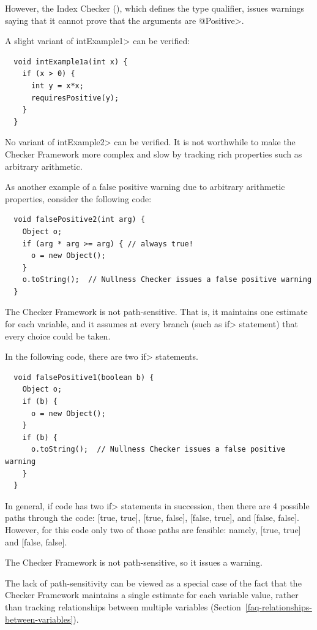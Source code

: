 \noindent
However, the Index Checker (), which defines the
 type qualifier, issues warnings
saying that it cannot prove that the arguments are \<@Positive>.

A slight variant of \<intExample1> can be verified:

\begin{Verbatim}
  void intExample1a(int x) {
    if (x > 0) {
      int y = x*x;
      requiresPositive(y);
    }
  }
\end{Verbatim}

\noindent
No variant of \<intExample2> can be verified.  It is not worthwhile to make
the Checker Framework more complex and slow by tracking rich properties
such as arbitrary arithmetic.

As another example of a false positive warning due to arbitrary arithmetic
properties, consider the following code:

\begin{Verbatim}
  void falsePositive2(int arg) {
    Object o;
    if (arg * arg >= arg) { // always true!
      o = new Object();
    }
    o.toString();  // Nullness Checker issues a false positive warning
  }
\end{Verbatim}



The Checker Framework is not path-sensitive.  That is, it maintains one
estimate for each variable, and it assumes at every branch (such as \<if>
statement) that every choice could be taken.

In the following code, there are two \<if> statements.

\begin{Verbatim}
  void falsePositive1(boolean b) {
    Object o;
    if (b) {
      o = new Object();
    }
    if (b) {
      o.toString();  // Nullness Checker issues a false positive warning
    }
  }
\end{Verbatim}

In general, if code has two \<if> statements in succession, then there are
4 possible paths through the code:  [true, true], [true, false], [false,
  true], and [false, false].  However, for this code only two of those
paths are feasible:  namely, [true, true] and [false, false].

The Checker Framework is not path-sensitive, so it issues a warning.

The lack of path-sensitivity can be viewed as a special case of the fact that
the Checker Framework maintains a single estimate for each variable value,
rather than tracking relationships between multiple variables
(Section~\ref{faq-relationships-between-variables}).


